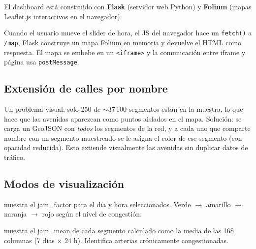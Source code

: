 \documentclass[12pt,a4paper]{article}
\begin{document}
El dashboard está construido con \textbf{Flask} (servidor web Python) y
\textbf{Folium} (mapas Leaflet.js interactivos en el navegador).

\begin{center}
\end{center}

Cuando el usuario mueve el slider de hora, el JS del navegador hace un
\texttt{fetch()} a \texttt{/map}, Flask construye un mapa Folium en memoria
y devuelve el HTML como respuesta.
El mapa se embebe en un \texttt{<iframe>} y la comunicación entre iframe y
página usa \texttt{postMessage}.

\subsection{Extensión de calles por nombre}

Un problema visual: solo 250 de $\sim$37\,100 segmentos están en la muestra,
lo que hace que las avenidas aparezcan como puntos aislados en el mapa.
Solución: se carga un GeoJSON con \emph{todos} los segmentos de la red,
y a cada uno que comparte nombre con un segmento muestreado se le asigna
el color de ese segmento (con opacidad reducida).
Esto extiende visualmente las avenidas sin duplicar datos de tráfico.

\subsection{Modos de visualización}

\begin{description}[noitemsep]
  \item[\textbf{Por hora:}] muestra el jam\_factor para el día y hora
    seleccionados. Verde $\to$ amarillo $\to$ naranja $\to$ rojo según
    el nivel de congestión.
  \item[\textbf{Promedio histórico:}] muestra el jam\_mean de cada segmento
    calculado como la media de las 168 columnas (7 días $\times$ 24 h).
    Identifica arterias crónicamente congestionadas.
\end{description}
\end{document}
